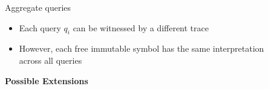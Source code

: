 \documentclass[10pt,aspectratio=149]{beamer}
\begin{document}

\begin{frame}[t]{\alert{Aggregate} queries}

\expr{%
(\checksys $S$ \\
\begin{tabular}{ll}
 \inputa 
   & (\,($i_1$ $\mi{\delta}_1$) $\,\cdots$ ($i_m$ $\mi{\delta}_m$)\,) \\
 \outputa
   & (\,($o_1$ $\mi{\tau}_1$) $\,\cdots$ ($o_n$ $\mi{\tau}_n$)\,) \\
 $\vdots$ \\  
   \alert{\queriesa} & (($q_1$ ($g_{1,1}$ $\,\cdots$ $g_{1,n_1}$)) $\cdots$ ($q_k$ ($g_{k,1}$ $\,\cdots$ $g_{k,n_k}$)))
\end{tabular} \\
)
}
\bigskip


\begin{itemize}
\item Each query $q_i$ can be witnessed by a \alert{different trace}
\item However, each free immutable symbol has the \alert{same interpretation} \\
      across all queries
\end{itemize}

\end{frame}


\begin{frame}{}
\LARGE
\centering
\bigskip

\textbf{Possible Extensions}

\end{frame}

\end{document}
